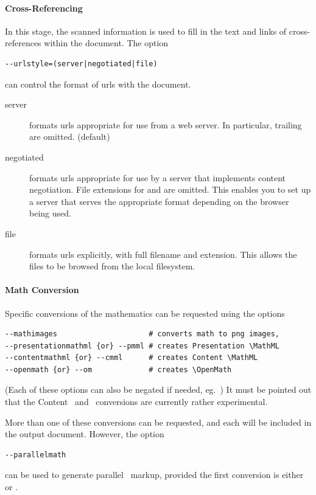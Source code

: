 \documentclass{book}
\begin{document}
\paragraph{Cross-Referencing}
In this stage, the scanned information is used to fill in the
text and links of cross-references within the document.
The option
\begin{lstlisting}[style=shell]
--urlstyle=(server|negotiated|file)
\end{lstlisting}
can control the format of urls with the document.
\begin{description}
  \item[server] formats urls appropriate for use from a web server.
    In particular, trailing  are omitted. (default)
  \item[negotiated] formats urls appropriate for use by a server
    that implements content negotiation. File extensions for 
    and  are omitted.  This enables you to set up a server
    that serves the appropriate format depending on the browser being used.
  \item[file] formats urls explicitly, with full filename and extension.
    This allows the files to be browsed from the local filesystem.
\end{description}

\paragraph{Math Conversion}
Specific conversions of the mathematics can be requested
using the options
\begin{lstlisting}[style=shell]
--mathimages                     # converts math to png images,
--presentationmathml {or} --pmml # creates Presentation \MathML
--contentmathml {or} --cmml      # creates Content \MathML
--openmath {or} --om             # creates \OpenMath
\end{lstlisting}
(Each of these options can also be negated if needed, eg.~)
It must be pointed out that the Content \MathML\ and \OpenMath\
conversions are currently rather experimental.

More than one of these conversions can be requested, and
each will be included in the output document.
However, the option
\begin{lstlisting}[style=shell]
--parallelmath
\end{lstlisting}
can be used to generate parallel \MathML\ markup, provided the first
conversion is either \code{--pmml} or \code{--cmml}.
\end{document}
